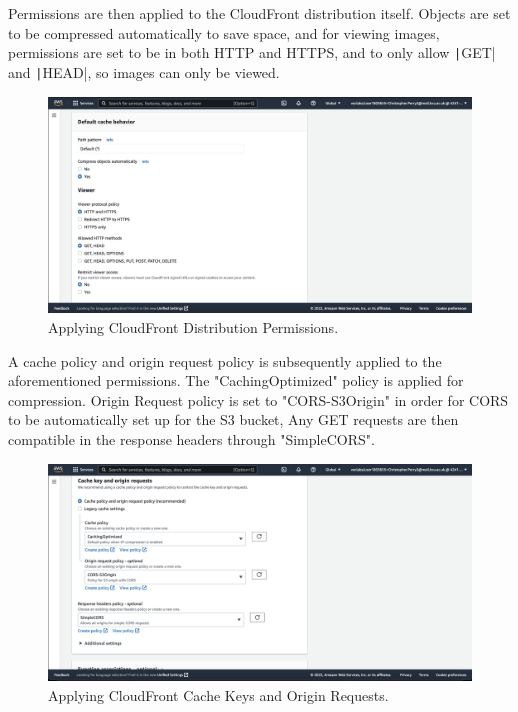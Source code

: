 \clearpage

Permissions are then applied to the CloudFront distribution itself.
Objects are set to be compressed automatically to save space, and for viewing images, permissions are set to be in
both HTTP and HTTPS, and to only allow \texttt|GET| and \texttt|HEAD|, so images can only be viewed.

\begin{figure}[!htbp]
    \centering
    \includegraphics[width=\textwidth]{resources/cloudfront/cloudfront-cache-behaviour}
    \caption{Applying CloudFront Distribution Permissions.}
    \label{fig:cloudfront-cache-behaviour}
\end{figure}

A cache policy and origin request policy is subsequently applied to the aforementioned permissions.
The "CachingOptimized" policy is applied for compression.
Origin Request policy is set to "CORS-S3Origin" in order for CORS to be automatically set up for the S3 bucket,
Any GET requests are then compatible in the response headers through "SimpleCORS".

\begin{figure}[!htbp]
    \centering
    \includegraphics[width=\textwidth]{resources/cloudfront/cloudfront-cache-key}
    \caption{Applying CloudFront Cache Keys and Origin Requests.}
    \label{fig:cloudfront-cache-key}
\end{figure}

